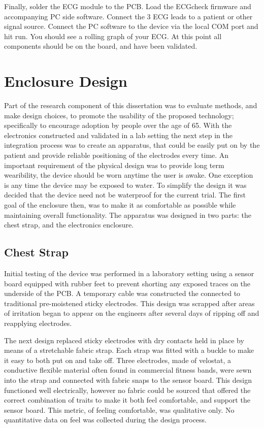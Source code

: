 Finally, solder the ECG module to the PCB. Load the ECGcheck firmware and accompanying PC side software. Connect the 3 ECG leads to a patient or other signal source. Connect the PC software to the device via the local COM port and hit run. You should see a rolling graph of your ECG. At this point all components should be on the board, and have been validated.


\section {Enclosure Design}
\label{sec:EnclosureDesign}
Part of the research component of this dissertation was to evaluate methods, and make design choices, to promote the usability of the  proposed technology; specifically to encourage adoption by people over the age of 65. With the electronics constructed and validated in a lab setting the next step in the integration process was to create an apparatus, that could be easily put on by the patient and provide reliable positioning of the electrodes every time. An important requirement of the physical design was to provide long term wearibility, the device should be worn anytime the user is awake. One exception is any time the device may be exposed to water. To simplify the design it was decided that the device need not be waterproof for the current trial. The first goal of the enclosure then, was to make it as comfortable as possible while maintaining overall functionality. The apparatus was designed in two parts: the chest strap, and the electronics enclosure.

\subsection {Chest Strap}
Initial testing of the device was performed in a laboratory setting using a sensor board equipped with rubber feet to prevent shorting any exposed traces on the underside of the PCB. A temporary cable was constructed the connected to traditional pre-moistened sticky electrodes. This design was scrapped after areas of irritation began to appear on the engineers after several days of ripping off and reapplying electrodes. 

The next design replaced sticky electrodes with dry contacts held in place by means of a stretchable fabric strap. Each strap was fitted with a buckle to make it easy to both put on and take off. Three electrodes, made of velostat, a conductive flexible material often found in commercial fitness bands, were sewn into the strap and connected with fabric snaps to the sensor board. This design functioned well electrically, however no fabric could be sourced that offered the correct combination of traits to make it both feel comfortable, and support the sensor board. This metric, of feeling comfortable, was qualitative only. No quantitative data on feel was collected during the design process.

